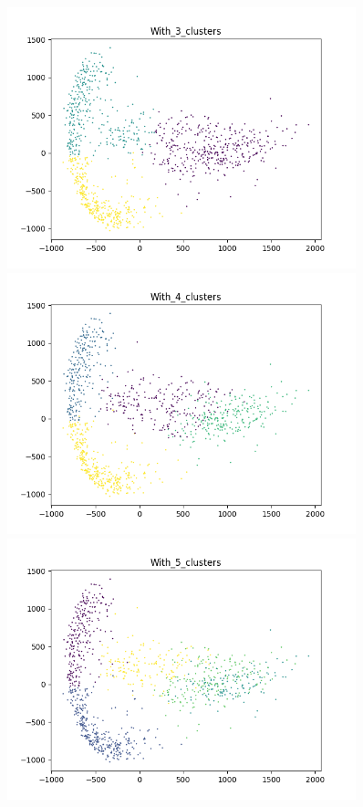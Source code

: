 \documentclass[11pt]{article}
\begin{document}
\begin{enumerate}
\begin{enumerate}
\begin{figure}[h!]
\begin{minipage}{0.45\textwidth}
         \includegraphics[width=0.9\textwidth]{With_3_clusters}
    \end{minipage}\hfill
    \begin{minipage}{0.45\textwidth}
    	\centering
         \includegraphics[width=0.9\textwidth]{With_4_clusters}
    \end{minipage}\hfill
    \begin{minipage}{0.45\textwidth}
    	\centering
         \includegraphics[width=0.9\textwidth]{With_5_clusters}
    \end{minipage}\hfill
\end{figure}


\end{enumerate}
\end{enumerate}
\end{document}
